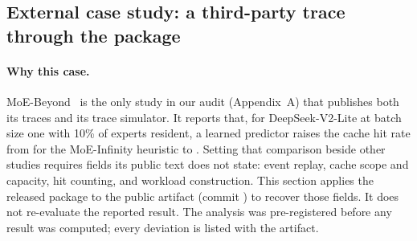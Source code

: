 \subsection{External case study: a third-party trace through the package}
\label{sec:case-study}

\paragraph{Why this case.}
MoE-Beyond~\cite{gavhane2025moebeyond} is the only study in our audit
(Appendix~A) that publishes both its traces and its trace simulator. It reports
that, for DeepSeek-V2-Lite at batch size one with 10\% of experts resident, a
learned predictor raises the cache hit rate from \CSreportedInfinity{} for the
MoE-Infinity heuristic to \CSreportedBeyond{}. Setting that comparison beside
other studies requires fields its public text does not state: event replay,
cache scope and capacity, hit counting, and workload construction. This section applies the released package to the public
artifact (commit \texttt{\CSthirdPartyCommit}) to recover those fields. It does
not re-evaluate the reported result. The analysis was pre-registered before any
result was computed; every deviation is listed with the artifact.

